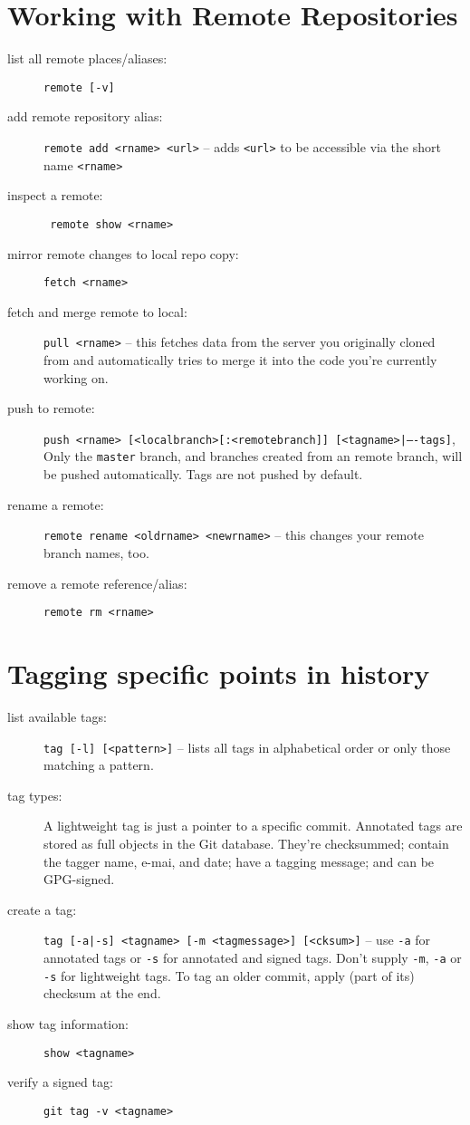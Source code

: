 \documentclass[a4paper,notumble]{leaflet} %
\begin{document}
\section{Working with Remote Repositories}
\begin{description}
\item[list all remote places/aliases:] \verb!remote [-v]!
\item[add remote repository alias:] \verb!remote add <rname> <url>! -- adds \verb!<url>! to be accessible via the short name \verb!<rname>! 
\item[inspect a remote:] \verb! remote show <rname>!\item[mirror remote changes to local repo copy:] \verb!fetch <rname>!
\item[fetch and merge remote to local:] \verb!pull <rname>! -- this fetches data from the server you originally cloned from and automatically tries to merge it into the code you’re currently working on.
\item[push to remote:] \texttt{push <rname> [<local\-branch>[:<remote\-branch]] [<tagname>|----tags]}, Only the \texttt{master} branch, and branches created from an remote branch, will be pushed automatically. Tags are not pushed by default.
\item[rename a remote:] \texttt{remote rename <oldrname> <newrname>} -- this changes your remote branch names, too.
\item[remove a remote reference/alias:] \verb!remote rm <rname>!
\end{description}

\section{Tagging specific points in history}
\begin{description}
\item[list available tags:] \verb!tag [-l] [<pattern>]! -- lists all tags in alphabetical order or only those matching a pattern.
\item[tag types:] A lightweight tag is just a pointer to a specific commit. Annotated tags are stored as full objects in the Git database. They’re checksummed; contain the tagger name, e-mai, and date; have a tagging message; and can be GPG-signed.
\item[create a tag:] \texttt{tag [-a|-s] <tagname> [-m <tag\-message>] [<cksum>]} -- use \verb!-a! for annotated tags or \verb!-s! for annotated and signed tags. Don't supply \verb!-m!, \verb!-a! or \verb!-s! for lightweight tags. To tag an older commit, apply (part of its) checksum at the end.
\item[show tag information:] \verb!show <tagname>!
\item[verify a signed tag:] \verb!git tag -v <tagname>!
\end{description}
\end{document}
